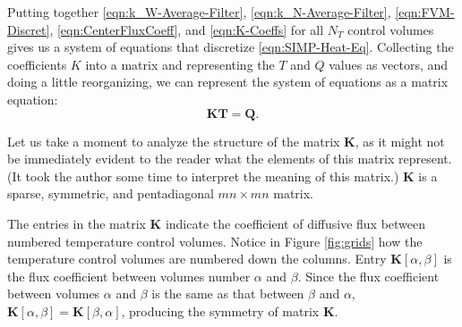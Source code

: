 Putting together \eqref{eqn:k_W-Average-Filter}, \eqref{eqn:k_N-Average-Filter}, \eqref{eqn:FVM-Discret}, \eqref{eqn:CenterFluxCoeff}, and \eqref{eqn:K-Coeffs} for all $N_T$ control volumes gives us a system of equations that discretize \eqref{eqn:SIMP-Heat-Eq}. Collecting the coefficients $K$ into a matrix and representing the $T$ and $Q$ values as vectors, and doing a little reorganizing, we can represent the system of equations as a matrix equation:
\begin{equation}
	\mathbf{K}\mathbf{T}=\mathbf{Q}.
\end{equation}

Let us take a moment to analyze the structure of the matrix $\mathbf{K}$, as it might not be immediately evident to the reader what the elements of this matrix represent. (It took the author some time to interpret the meaning of this matrix.) $\mathbf{K}$ is a sparse, symmetric, and pentadiagonal $mn\times mn$ matrix.

The entries in the matrix $\mathbf{K}$ indicate the coefficient of diffusive flux between numbered temperature control volumes. Notice in Figure \ref{fig:grids} how the temperature control volumes are numbered down the columns. Entry $\mathbf{K}[\alpha,\beta]$ is the flux coefficient between volumes number $\alpha$ and $\beta$. Since the flux coefficient between volumes $\alpha$ and $\beta$ is the same as that between $\beta$ and $\alpha$, $\mathbf{K}[\alpha,\beta]=\mathbf{K}[\beta,\alpha]$, producing the symmetry of matrix $\mathbf{K}$.
